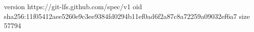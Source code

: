 version https://git-lfs.github.com/spec/v1
oid sha256:11f05412aee5260e9c3ee9384fd0294b11ef0ad6f2a87c8a72259a09032ef6a7
size 57794
